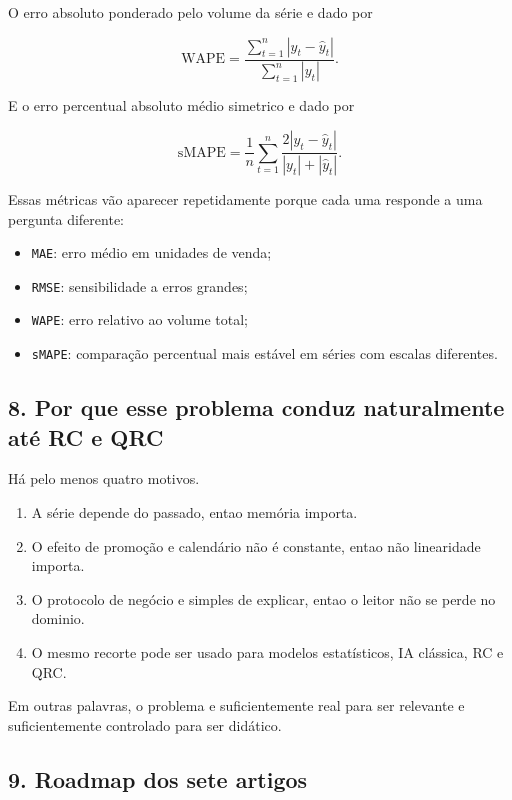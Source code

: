 \documentclass[12pt]{article}
\providecommand{\tightlist}{%
  \setlength{\itemsep}{0pt}\setlength{\parskip}{0pt}}
\begin{document}
O erro absoluto ponderado pelo volume da série e dado por

\[
\mathrm{WAPE} = \frac{\sum_{t=1}^n |y_t - \hat{y}_t|}{\sum_{t=1}^n |y_t|}.
\]

E o erro percentual absoluto médio simetrico e dado por

\[
\mathrm{sMAPE} = \frac{1}{n} \sum_{t=1}^n
\frac{2 |y_t - \hat{y}_t|}{|y_t| + |\hat{y}_t|}.
\]

Essas métricas vão aparecer repetidamente porque cada uma responde a uma pergunta diferente:

\begin{itemize}
\tightlist
\item
  \texttt{MAE}: erro médio em unidades de venda;
\item
  \texttt{RMSE}: sensibilidade a erros grandes;
\item
  \texttt{WAPE}: erro relativo ao volume total;
\item
  \texttt{sMAPE}: comparação percentual mais estável em séries com escalas diferentes.
\end{itemize}

\subsection{8. Por que esse problema conduz naturalmente até RC e QRC}\label{8-por-que-esse-problema-conduz-naturalmente-atuxe9-rc-e-qrc}

Há pelo menos quatro motivos.

\begin{enumerate}
\def\labelenumi{\arabic{enumi}.}
\tightlist
\item
  A série depende do passado, entao memória importa.
\item
  O efeito de promoção e calendário não é constante, entao não linearidade importa.
\item
  O protocolo de negócio e simples de explicar, entao o leitor não se perde no dominio.
\item
  O mesmo recorte pode ser usado para modelos estatísticos, IA clássica, RC e QRC.
\end{enumerate}

Em outras palavras, o problema e suficientemente real para ser relevante e suficientemente controlado para ser didático.

\subsection{9. Roadmap dos sete artigos}\label{9-roadmap-dos-sete-artigos}
\end{document}
